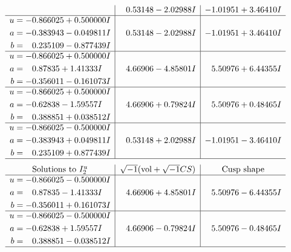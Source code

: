 \documentclass[1p]{elsarticle_modified}
\theoremstyle{definition}
\newcommand{\I}{\sqrt{-1}}
\begin{document}
$$\begin{array}{c|c|c}
 & \phantom{-}0.53148 - 2.02988 I & -1.01951 + 3.46410 I \\ \hline\begin{aligned}
u &= -0.866025 + 0.500000 I \\
a &= -0.383943 - 0.049811 I \\
b &= \phantom{-}0.235109 - 0.877439 I\end{aligned}
 & \phantom{-}0.53148 - 2.02988 I & -1.01951 + 3.46410 I \\ \hline\begin{aligned}
u &= -0.866025 + 0.500000 I \\
a &= \phantom{-}0.87835 + 1.41333 I \\
b &= -0.356011 - 0.161073 I\end{aligned}
 & \phantom{-}4.66906 - 4.85801 I & \phantom{-}5.50976 + 6.44355 I \\ \hline\begin{aligned}
u &= -0.866025 + 0.500000 I \\
a &= -0.62838 - 1.59557 I \\
b &= \phantom{-}0.388851 + 0.038512 I\end{aligned}
 & \phantom{-}4.66906 + 0.79824 I & \phantom{-}5.50976 + 0.48465 I \\ \hline\begin{aligned}
u &= -0.866025 - 0.500000 I \\
a &= -0.383943 + 0.049811 I \\
b &= \phantom{-}0.235109 + 0.877439 I\end{aligned}
 & \phantom{-}0.53148 + 2.02988 I & -1.01951 - 3.46410 I\\
 \hline 
 \end{array}$$\newpage$$\begin{array}{c|c|c}  
\text{Solutions to }I^u_{2}& \I (\text{vol} + \sqrt{-1}CS) & \text{Cusp shape}\\
 \hline 
\begin{aligned}
u &= -0.866025 - 0.500000 I \\
a &= \phantom{-}0.87835 - 1.41333 I \\
b &= -0.356011 + 0.161073 I\end{aligned}
 & \phantom{-}4.66906 + 4.85801 I & \phantom{-}5.50976 - 6.44355 I \\ \hline\begin{aligned}
u &= -0.866025 - 0.500000 I \\
a &= -0.62838 + 1.59557 I \\
b &= \phantom{-}0.388851 - 0.038512 I\end{aligned}
 & \phantom{-}4.66906 - 0.79824 I & \phantom{-}5.50976 - 0.48465 I\\
 \hline 
 \end{array}$$\newpage
\end{document}
